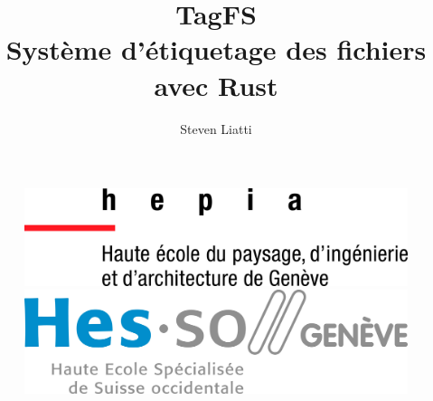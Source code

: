 \documentclass[a4paper, 12pt]{article}
\begin{document}
\title{TagFS \protect\\ Système d'étiquetage des fichiers avec Rust}
\author{Steven Liatti}
\maketitle



\begin{figure}[!b]
	\centering
	\begin{minipage}{.5\textwidth}
		\centering
		\includegraphics[width=.7\linewidth]{images/hepia.jpg}
	\end{minipage}%
	\begin{minipage}{.5\textwidth}
		\centering
		\includegraphics[width=.7\linewidth]{images/hesso.jpg}
	\end{minipage}
\end{figure}
\newpage
\thispagestyle{empty}
\mbox{}


\newpage
\end{document}
